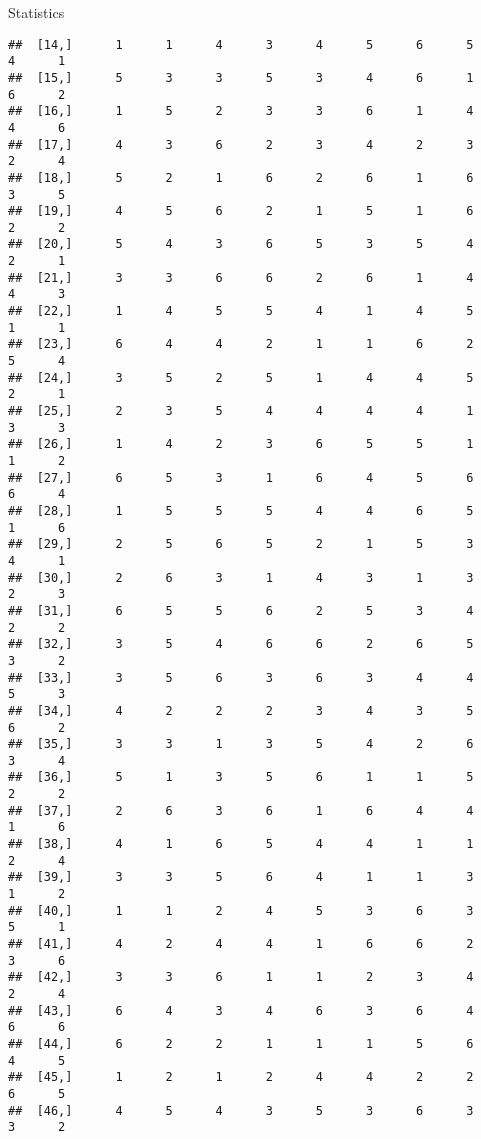 \documentclass[
  ignorenonframetext,
]{beamer}
\begin{document}
\begin{frame}[fragile]{Statistics}
\begin{verbatim}
##  [14,]      1      1      4      3      4      5      6      5      4      1
##  [15,]      5      3      3      5      3      4      6      1      6      2
##  [16,]      1      5      2      3      3      6      1      4      4      6
##  [17,]      4      3      6      2      3      4      2      3      2      4
##  [18,]      5      2      1      6      2      6      1      6      3      5
##  [19,]      4      5      6      2      1      5      1      6      2      2
##  [20,]      5      4      3      6      5      3      5      4      2      1
##  [21,]      3      3      6      6      2      6      1      4      4      3
##  [22,]      1      4      5      5      4      1      4      5      1      1
##  [23,]      6      4      4      2      1      1      6      2      5      4
##  [24,]      3      5      2      5      1      4      4      5      2      1
##  [25,]      2      3      5      4      4      4      4      1      3      3
##  [26,]      1      4      2      3      6      5      5      1      1      2
##  [27,]      6      5      3      1      6      4      5      6      6      4
##  [28,]      1      5      5      5      4      4      6      5      1      6
##  [29,]      2      5      6      5      2      1      5      3      4      1
##  [30,]      2      6      3      1      4      3      1      3      2      3
##  [31,]      6      5      5      6      2      5      3      4      2      2
##  [32,]      3      5      4      6      6      2      6      5      3      2
##  [33,]      3      5      6      3      6      3      4      4      5      3
##  [34,]      4      2      2      2      3      4      3      5      6      2
##  [35,]      3      3      1      3      5      4      2      6      3      4
##  [36,]      5      1      3      5      6      1      1      5      2      2
##  [37,]      2      6      3      6      1      6      4      4      1      6
##  [38,]      4      1      6      5      4      4      1      1      2      4
##  [39,]      3      3      5      6      4      1      1      3      1      2
##  [40,]      1      1      2      4      5      3      6      3      5      1
##  [41,]      4      2      4      4      1      6      6      2      3      6
##  [42,]      3      3      6      1      1      2      3      4      2      4
##  [43,]      6      4      3      4      6      3      6      4      6      6
##  [44,]      6      2      2      1      1      1      5      6      4      5
##  [45,]      1      2      1      2      4      4      2      2      6      5
##  [46,]      4      5      4      3      5      3      6      3      3      2

\end{verbatim}
\end{frame}
\end{document}
